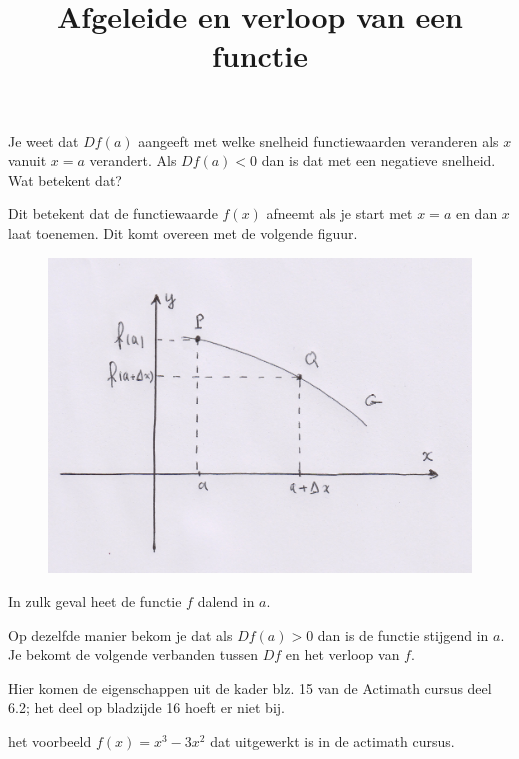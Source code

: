 \documentclass{article}
\title{Afgeleide en verloop van een functie}
\date { }
\begin{document}
\maketitle \noindent

\noindent Je weet dat $Df(a)$ aangeeft met welke snelheid functiewaarden veranderen als $x$ vanuit $x=a$ verandert.
Als $Df(a)<0$ dan is dat met een negatieve snelheid. Wat betekent dat?\vspace{5mm}

\noindent Dit betekent dat de functiewaarde $f(x)$ afneemt als je start met $x=a$ en dan $x$ laat toenemen.
Dit komt overeen met de volgende figuur.
\begin{figure}[h]
\begin{center}
\includegraphics[height=5 cm]{dalend.JPG}
\end{center}
\end{figure}

\noindent In zulk geval heet de functie $f$ dalend in $a$.\vspace{5mm}

\noindent Op dezelfde manier bekom je dat als $Df(a)>0$ dan is de functie stijgend in $a$.
Je bekomt de volgende verbanden tussen $Df$ en het verloop van $f$.

\begin{eigenschap}
Hier komen de eigenschappen uit de kader blz. 15 van de Actimath cursus deel 6.2; het deel op bladzijde 16 hoeft er niet bij.
\end{eigenschap}

\begin{voorbeeld}
het voorbeeld $f(x)=x^3-3x^2$ dat uitgewerkt is in de actimath cursus.
\end{voorbeeld}
\end{document}

